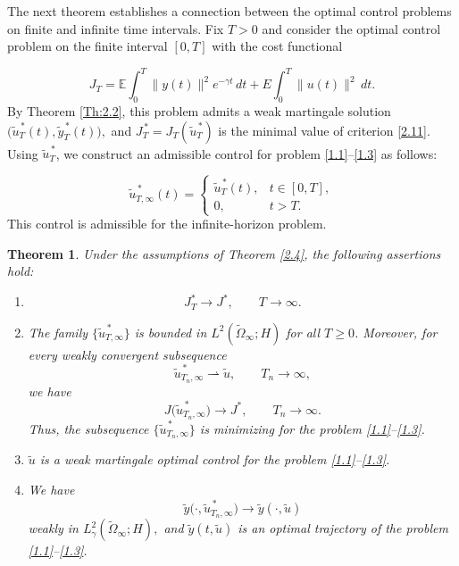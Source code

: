 \documentclass[a4paper,12pt]{article}
\newtheorem{theorem}[definition]{Theorem}
\numberwithin{equation}{section}
\def\E{\mathbb{E}}
\begin{document}
The next theorem establishes a connection between the optimal
control problems on finite and infinite time intervals.
Fix $T>0$ and consider the optimal control problem on the finite interval
$[0,T]$ with the cost functional

\begin{equation}
J_T
=
\E\int_0^T
\|y(t)\|^2 e^{-\gamma t}\,dt
+
E\int_0^T
\|u(t)\|^2\,dt .
\label{2.11}
\end{equation}
By Theorem \ref{Th:2.2}, this problem admits a weak martingale solution
$
\bigl(
\widetilde u_T^{\,*}(t),
\widetilde y_T^{\,*}(t)
\bigr),
$
and 
$
J_T^{\,*} = J_T(\widetilde u_T^{\,*})
$
is the minimal value of criterion \eqref{2.11}. Using $\widetilde u_T^{\,*}$, we construct an admissible control
for problem \eqref{1.1}--\eqref{1.3} as follows:

\begin{equation}
\widetilde u_{T,\infty}^{\,*}(t)
=
\begin{cases}
\widetilde u_T^{\,*}(t),
& t\in[0,T], \\[1ex]
0,
& t>T .
\end{cases}
\label{2.13}
\end{equation}
This control is admissible for the
infinite-horizon problem.

\begin{theorem}\label{Th:2.5}
Under the assumptions of Theorem \ref{2.4}, the following assertions hold:

\begin{enumerate}
\item
\[
J_T^{*}\to J^{*},
\qquad
T\to\infty.
\]

\item
The family $ \{\widetilde u_{T,\infty}^{\,*}\}$  is bounded in $
L^2(\widetilde\Omega_\infty;H)
$ for all $T \geq 0$. Moreover, for every weakly convergent subsequence
\[
\widetilde u_{T_n,\infty}^{\,*}
\rightharpoonup
\widetilde u,
\qquad
T_n\to\infty,
\]
we have
\[
J\bigl(\widetilde u_{T_n,\infty}^{\,*}\bigr)
\to
J^{*},
\qquad
T_n\to\infty.
\]
Thus, the subsequence $
\{\widetilde u_{T_n,\infty}^{\,*}\}
$ is minimizing for the problem
\eqref{1.1}--\eqref{1.3}.

\item $\widetilde u$ is a weak martingale optimal control for the problem
\eqref{1.1}--\eqref{1.3}.

\item We have
\[
\widetilde y\bigl(\cdot,
\widetilde u_{T_n,\infty}^{\,*}\bigr)
\to
\widetilde y(\cdot,\widetilde u)
\]
weakly in $L_\gamma^2(\widetilde\Omega_\infty;H),$ and $
\widetilde y(t,\widetilde u)
$ is an optimal trajectory of the problem
\eqref{1.1}--\eqref{1.3}.
\end{enumerate}
\end{theorem}
\end{document}
